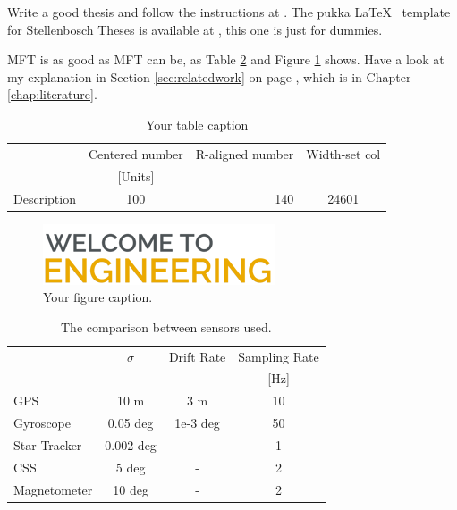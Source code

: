 Write a good thesis and follow the instructions at \cite{sun_thesis_guide}. The pukka \LaTeX ~ template for Stellenbosch Theses is available at \cite{sun_latex_template}, this one is just for dummies.


\Ac{MFT} is as good as \ac{MFT} can be, as Table \ref{tab:my_label} and Figure \ref{fig:enter-label} shows.
Have a look at my explanation in Section \ref{sec:relatedwork} on page \pageref{sec:relatedwork}, which is in Chapter \ref{chap:literature}.


\begin{table}[H]
    \caption{Your table caption}
    \footnotesize
    \centering
    \begin{tabular}{ccrp{3cm}}    %
    \toprule
         & Centered number & R-aligned number &  Width-set col\\
         & [Units] & & \\
    \midrule
        Description & 100 & 140 & \multicolumn{1}{c}{24601}\\
    \bottomrule
    \end{tabular}
    \label{tab:my_label}
\end{table}

\begin{figure}
    \centering
    \includegraphics[width=0.8\linewidth]{figures/Faculty-of-Engineering-Stellenbosch-University-Logo.png}
    \caption{Your figure caption.}
    \label{fig:enter-label}
\end{figure}


\begin{table}[H]
    \caption{The comparison between sensors used.}
    \footnotesize
    \centering
    \begin{tabular}{lccc}
    \toprule
         & $\sigma$ & Drift Rate &  Sampling Rate \\
         & & & [Hz] \\
    \midrule
        GPS & 10 m & 3 m & 10 \\
        Gyroscope & 0.05 deg & 1e-3 deg & 50 \\
        Star Tracker & 0.002 deg & - & 1 \\
        CSS & 5 deg & - & 2 \\
        Magnetometer & 10 deg & - & 2 \\
    \bottomrule
    \end{tabular}
    \label{tab:my_label}
\end{table}

